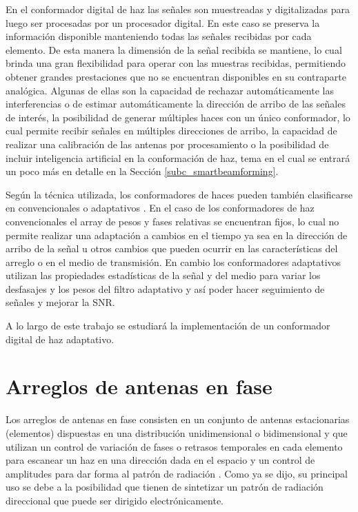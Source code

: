 En el conformador digital de haz las señales son muestreadas y digitalizadas para luego ser procesadas por un procesador digital. En este caso se preserva la información disponible manteniendo todas las señales recibidas por cada elemento. De esta manera la dimensión de la señal recibida se mantiene, lo cual brinda una gran flexibilidad para operar con las muestras recibidas, permitiendo obtener grandes prestaciones que no se encuentran disponibles en su contraparte analógica. Algunas de ellas son la capacidad de rechazar automáticamente las interferencias o de estimar automáticamente la dirección de arribo de las señales de interés, la posibilidad de generar múltiples haces con un único conformador, lo cual permite recibir señales en múltiples direcciones de arribo, la capacidad de realizar una calibración de las antenas por procesamiento o la posibilidad de incluir inteligencia artificial en la conformación de haz, tema en el cual se entrará un poco más en detalle en la Sección \ref{subc_smartbeamforming}.

Según la técnica utilizada, los conformadores de haces pueden también clasificarse en convencionales o adaptativos \cite{bib:digitalantennasp6}. En el caso de los conformadores de haz convencionales el array de pesos y fases relativas se encuentran fijos, lo cual no permite realizar una adaptación a cambios en el tiempo ya sea en la dirección de arribo de la señal u otros cambios que pueden ocurrir en las características del arreglo o en el medio de transmisión. En cambio los conformadores adaptativos utilizan las propiedades estadísticas de la señal y del medio para variar los desfasajes y los pesos del filtro adaptativo y así poder hacer seguimiento de señales y mejorar la SNR.

A lo largo de este trabajo se estudiará la implementación de un conformador digital de haz adaptativo.


\section{Arreglos de antenas en fase}\label{subc:beamforming_phasedarrays}

Los arreglos de antenas en fase consisten en un conjunto de antenas estacionarias (elementos) dispuestas en una distribución unidimensional o bidimensional y que utilizan un control de variación de fases o retrasos temporales en cada elemento para escanear un haz en una dirección dada en el espacio y un control de amplitudes para dar forma al patrón de radiación \cite{bib:phahandbook_p1}. Como ya se dijo, su principal uso se debe a la posibilidad que tienen de sintetizar un patrón de radiación direccional que puede ser dirigido electrónicamente.

